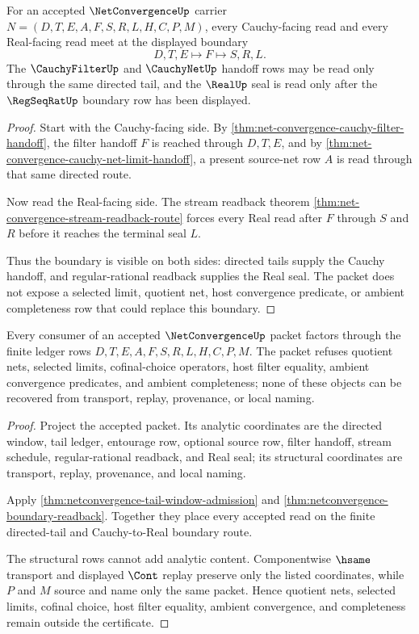 \begin{theorem}
\label{thm:netconvergence-boundary-readback}
For an accepted $\NetConvergenceUp$ carrier $N=(D,T,E,A,F,S,R,L,H,C,P,M)$, every Cauchy-facing read and every Real-facing read meet at the displayed boundary
$$
D,T,E
\longmapsto
F
\longmapsto
S,R,L .
$$
The $\CauchyFilterUp$ and $\CauchyNetUp$ handoff rows may be read only through the same directed tail, and the $\RealUp$ seal is read only after the $\RegSeqRatUp$ boundary row has been displayed.
\end{theorem}
\begin{proof}
Start with the Cauchy-facing side. By \autoref{thm:net-convergence-cauchy-filter-handoff}, the filter handoff $F$ is reached through $D,T,E$, and by \autoref{thm:net-convergence-cauchy-net-limit-handoff}, a present source-net row $A$ is read through that same directed route.

Now read the Real-facing side. The stream readback theorem \autoref{thm:net-convergence-stream-readback-route} forces every Real read after $F$ through $S$ and $R$ before it reaches the terminal seal $L$.

Thus the boundary is visible on both sides: directed tails supply the Cauchy handoff, and regular-rational readback supplies the Real seal. The packet does not expose a selected limit, quotient net, host convergence predicate, or ambient completeness row that could replace this boundary.
\end{proof}

\begin{theorem}
\label{thm:netconvergence-ledger-nonescape}
Every consumer of an accepted $\NetConvergenceUp$ packet factors through the finite ledger rows $D,T,E,A,F,S,R,L,H,C,P,M$. The packet refuses quotient nets, selected limits, cofinal-choice operators, host filter equality, ambient convergence predicates, and ambient completeness; none of these objects can be recovered from transport, replay, provenance, or local naming.
\end{theorem}
\begin{proof}
Project the accepted packet. Its analytic coordinates are the directed window, tail ledger, entourage row, optional source row, filter handoff, stream schedule, regular-rational readback, and Real seal; its structural coordinates are transport, replay, provenance, and local naming.

Apply \autoref{thm:netconvergence-tail-window-admission} and \autoref{thm:netconvergence-boundary-readback}. Together they place every accepted read on the finite directed-tail and Cauchy-to-Real boundary route.

The structural rows cannot add analytic content. Componentwise $\hsame$ transport and displayed $\Cont$ replay preserve only the listed coordinates, while $P$ and $M$ source and name only the same packet. Hence quotient nets, selected limits, cofinal choice, host filter equality, ambient convergence, and completeness remain outside the certificate.
\end{proof}


